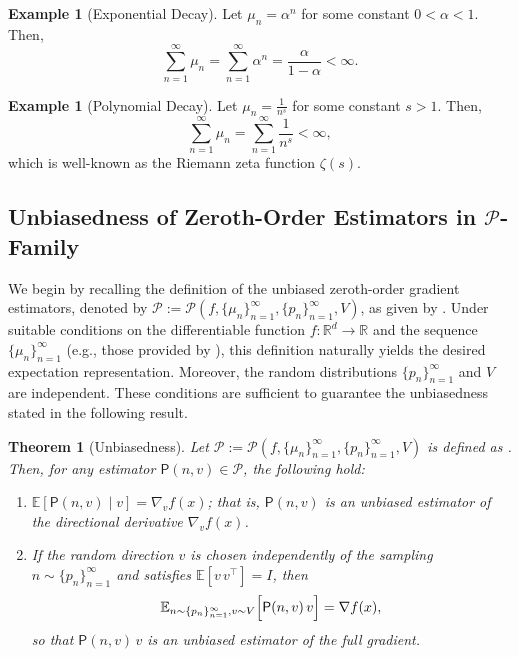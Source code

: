 \documentclass{article}
\newcommand{\RR}{\mathbb{R}}
\theoremstyle{definition}
\newtheorem{example}[definition]{Example}
\theoremstyle{plain}
\newtheorem{theorem}[definition]{Theorem}
\theoremstyle{remark}
\begin{document}
\begin{example}[Exponential Decay]
Let \( \mu_n = \alpha^n \) for some constant \( 0 < \alpha < 1 \). Then,
\[
\sum_{n=1}^\infty \mu_n = \sum_{n=1}^\infty \alpha^n = \frac{\alpha}{1 - \alpha} < \infty.
\] 
\end{example}

\begin{example}[Polynomial Decay]
Let \( \mu_n = \frac{1}{n^s} \) for some constant \( s > 1 \). Then,
\[
\sum_{n=1}^\infty \mu_n = \sum_{n=1}^\infty \frac{1}{n^s} < \infty,
\]
which is well-known as the Riemann zeta function $\zeta(s)$. 
\end{example} 

  

\subsection{Unbiasedness of Zeroth-Order Estimators in $\mathscr{P}$-Family} \label{sec:unbiasedness}  
We begin by recalling the definition of the unbiased zeroth-order gradient estimators, denoted by $\mathscr{P}:=\mathscr{P}(f, \{\mu_n\}_{n=1}^\infty, \{p_n\}_{n=1}^\infty,V)$, as given by . Under suitable conditions on the differentiable function $f:\RR^d \to \RR$ and the sequence $\{\mu_n\}_{n=1}^\infty$ (e.g., those provided by ), this definition naturally yields the desired expectation representation. Moreover,  the random distributions $\{p_n\}_{n=1}^\infty$ and $V$ are independent. These conditions are sufficient to guarantee the unbiasedness stated in the following result.
\begin{theorem}[Unbiasedness]\label{thm:unbiased-appendix}
Let $\mathscr{P}:=\mathscr{P}(f, \{ \mu_n\}_{n=1}^\infty, \{ p_n\}_{n=1}^\infty,V)$ is defined as . Then, for any estimator $\mathsf{P}(n,v) \in \mathscr{P}$, the following hold:
\begin{enumerate}[label=(\alph*)]
    \item \(\mathbb{E}[\mathsf{P}(n,v) \mid v] = \nabla_v f(x)\); that is, \(\mathsf{P}(n,v)\) is an unbiased estimator of the directional derivative $\nabla_v f(x)$.
    \item If the random direction \(v\) is chosen independently of the sampling $n\sim \{p_n\}_{n=1}^\infty $ and satisfies \(\mathbb{E}[v\,v^\top]=I\), then
    \[
    \mathbb{E}_{n\sim \{p_n\}_{n=1}^\infty , v\sim V}\Bigl[\mathsf{P}(n,v)\,v\Bigr] = \nabla f(x),
    \]
    so that \(\mathsf{P}(n,v)\,v\) is an unbiased estimator of the full gradient.
\end{enumerate}
\end{theorem}
\end{document}

